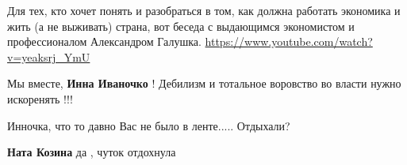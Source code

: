 \begin{itemize}
Для тех, кто хочет понять и разобраться в том, как должна работать экономика и
жить (а не выживать) страна, вот беседа с выдающимся экономистом и
профессионалом Александром Галушка. \url{https://www.youtube.com/watch?v=yeaksrj_YmU}

 
Мы вместе, \textbf{Инна Иваночко} !
Дебилизм и тотальное воровство во власти нужно искоренять !!!

 
Инночка, что то давно Вас не было в ленте..... Отдыхали?

\begin{itemize}
 
\textbf{Ната Козина} да , чуток отдохнула
\end{itemize}

 


\end{itemize}
